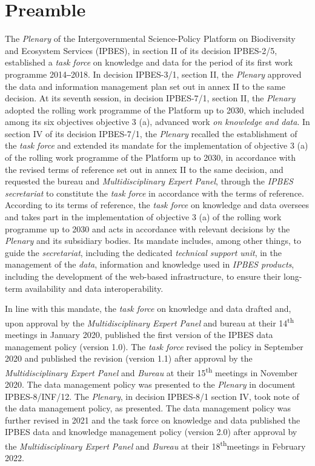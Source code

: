 \documentclass{article}
\begin{document}
\section*{Preamble}

The \textit{Plenary }of the Intergovernmental Science-Policy Platform on Biodiversity and Ecosystem Services (IPBES), in section II of its decision IPBES-2/5, established a \textit{task force} on knowledge and data for the period of its first work programme 2014‒2018. In decision IPBES-3/1, section II, the \textit{Plenary} approved the data and information management plan set out in annex II to the same decision. At its seventh session, in decision IPBES-7/1, section II, the \textit{Plenary} adopted the rolling work programme of the Platform up to 2030, which included among its six objectives objective 3 (a), advanced work \textit{on knowledge and data}. In section IV of its decision IPBES-7/1, the \textit{Plenary }recalled the establishment of the \textit{task force} and extended its mandate for the implementation of objective 3 (a) of the rolling work programme of the Platform up to 2030, in accordance with the revised terms of reference set out in annex II to the same decision, and requested the \gls{bureau} and \textit{Multidisciplinary Expert Panel}, through the \textit{IPBES secretariat} to constitute the \textit{task force} in accordance with the terms of reference. According to its terms of reference, the \textit{task force} on knowledge and data oversees and takes part in the implementation of objective 3 (a) of the rolling work programme up to 2030 and acts in accordance with relevant decisions by the \textit{Plenary} and its subsidiary bodies. Its mandate includes, among other things, to guide the \textit{secretariat}, including the dedicated \textit{technical support unit}, in the management of the \textit{data}, information and knowledge used in \textit{IPBES products}, including the development of the web-based infrastructure, to ensure their long-term availability and data interoperability.

In line with this mandate, the \textit{task force} on knowledge and data drafted and, upon approval by the \textit{Multidisciplinary Expert Panel} and \gls{bureau} at their 14\textsuperscript{th} meetings in January 2020, published the first version of the IPBES data management policy (version 1.0). The \textit{task force }revised the policy in September 2020 and published the revision (version 1.1) after approval by the \textit{Multidisciplinary Expert Panel }and \textit{Bureau }at their 15\textsuperscript{th} meetings in November 2020. The data management policy was presented to the \textit{Plenary }in document IPBES-8/INF/12. The \textit{Plenary}, in decision IPBES-8/1 section IV, took note of the data management policy, as presented. The data management policy was further revised in 2021 and the task force on knowledge and data published the IPBES data and knowledge management policy (version 2.0) after approval by the \textit{Multidisciplinary Expert Panel }and \textit{Bureau }at their 18\textsuperscript{th}meetings in February 2022.
\end{document}
